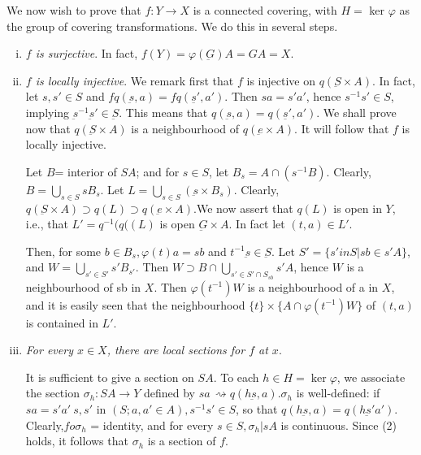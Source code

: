 We now wish to prove that $f: Y \to X$ is a connected covering, with
$H=$ ker $\varphi$ as the group of covering transformations. We do
this in several steps. 
\begin{enumerate}[(i)]
\item \textit{ $f$ is surjective}. In fact, $f(Y) = \varphi
  (\underbar{G}) A = GA =X$. 
\item \textit{ $f$ is locally injective}. We remark first that $f$ is
  injective on $q(\underbar{S} \times A)$. In fact, let $s,s' \in S$
  and $f q(\underbar{s},a) = f q(\underbar{s'}, a')$. Then $sa = s'
  a'$, hence $s^{-1} s' \in S$, implying $\underbar{s}^{-1}
  \underbar{s}' \in \underbar{S}$. This means that $
  q(\underbar{s},a) =  q(\underbar{s'},a')$.  We shall prove now that
  $q(\underbar{S} \times A)$ is a neighbourhood of $q( \underbar{e}
  \times A)$. It will follow that $f$ is locally injective. 
  
  Let $B$= interior of $SA$; and for $s \in S$, let $B_s = A \cap
  (s^{-1} B)$. Clearly, $B=\bigcup \limits_{s \in S} s B_s$. Let $L =
  \bigcup \limits_{s \in S} (\underbar{s} \times B_s)$.  Clearly, $q
  (\underbar{S} \times A) \supset q(L) \supset q (\underbar{e} \times
  A)$.\pageoriginale We now assert that $q(L)$ is open in $Y$, i.e.,
  that $L' = q^{-1} 
  (q((L)$ is open $\underbar{G} \times A$. In fact let $(t,a) \in L'$. 
  
  Then, for some $b \in B_s, \varphi (t) a = sb$ and $t^{-1}
  \underbar{s} \in \underbar{S}$. Let $S'=\{  s' in S| sb \in s' A \}$,
  and $W = \bigcup\limits_{s' \in S'}  s'B_{s'}$. Then $W \supset B \cap
  \bigcup \limits_{s' \in S' \cap S_{sb}}s' A$, hence $W$ is a
  neighbourhood of sb in $X$. Then $\varphi(t^{-1})W$ is a
  neighbourhood of a in $X$, and it is easily seen that the
  neighbourhood $\{ t \} \times \{ A \cap \varphi (t^{-1}) W \}$ of
  $(t,a)$ is contained in $L'$. 

\item \textit{For every $x \in X$, there are local sections for $f$ at $x$}. 
  
  It is sufficient to give a section on $SA$. To each $ h \in H = \ker
  \varphi$, we associate the section $\sigma_h : SA \to Y$ defined by
  $sa\, \rightsquigarrow q(h \underbar{s},a). \sigma_h$ is well-defined: if
  $sa=s'a'~ s,s'$ in $(S; a,a' \in A) , s^{-1} s' \in S$, so that
  $q(h\underbar{s},a) =q(h \underbar{s}'a')$. Clearly,$f o \sigma_h$ =
  identity, and for every $s \in S, \sigma_h |sA$ is continuous. Since
  (2) holds, it follows that $\sigma_h$ is a section of $f$. 


\end{enumerate}
